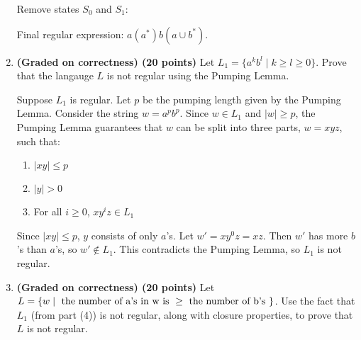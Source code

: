 \documentclass{article}
\theoremstyle{definition}
\newenvironment {solution}
{
\begin{tcolorbox}
}
{
\end{tcolorbox}
}
\begin{document}
\begin{enumerate}

    Remove states $S_0$ and $S_1$:

    \begin{solution}
    \end{solution}

    Final regular expression: $a(a^*)b(a \cup b^*)$.

    \item  \textbf{(Graded on correctness) (20 points)} 
    Let $L_1 = \{a^kb^l \mid k \geq l \geq 0\}$.
    Prove that the langauge $L$ is not regular using the Pumping Lemma.

    \begin{solution}
        Suppose $L_1$ is regular. Let $p$ be the pumping length given by the Pumping Lemma. Consider the string $w = a^pb^p$. Since $w \in L_1$ and $|w| \geq p$, the Pumping Lemma guarantees that $w$ can be split into three parts, $w = xyz$, such that:
        \begin{enumerate}
            \item $|xy| \leq p$
            \item $|y| > 0$
            \item For all $i \geq 0$, $xy^iz \in L_1$
        \end{enumerate}
        Since $|xy| \leq p$, $y$ consists of only $a$'s. Let $w' = xy^0z = xz$. Then $w'$ has more $b$'s than $a$'s, so $w' \notin L_1$. This contradicts the Pumping Lemma, so $L_1$ is not regular.
    \end{solution}

    \item \textbf{(Graded on correctness) (20 points)}
    Let $L = \{w \mid \textnormal{ the number of a's in w is } \geq \textnormal{ the number of b's }\}$. Use the fact that $L_1$ (from part (4)) is not regular, along with closure properties, to prove that $L$ is not regular.


\end{enumerate}
\end{document}
